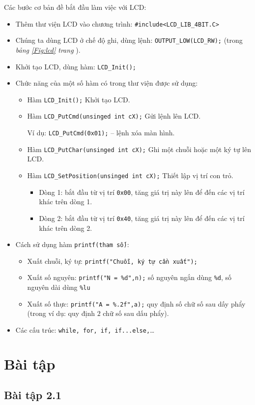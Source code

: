 Các bước cơ bản đề bắt đầu làm việc với LCD:
\begin{itemize}
\item Thêm thư viện LCD vào chương trình: \verb|#include<LCD_LIB_4BIT.C>|
\item Chúng ta dùng LCD ở chế độ ghi, dùng lệnh: \verb|OUTPUT_LOW(LCD_RW);| (trong \emph{bảng \ref{Fig:lcd} trang \pageref{Fig:lcd}}).
\item Khởi tạo LCD, dùng hàm: \verb|LCD_Init();|
\item Chức năng của một số hàm có trong thư viện được sử dụng:
\begin{itemize}
\item Hàm \verb|LCD_Init();| Khởi tạo LCD.
\item Hàm \verb|LCD_PutCmd(unsinged int cX);| Gửi lệnh lên LCD.

Ví dụ: \verb|LCD_PutCmd(0x01);| -- lệnh xóa màn hình.
\item Hàm \verb|LCD_PutChar(unsinged int cX);| Ghi một chuỗi hoặc một ký tự lên LCD.
\item Hàm \verb|LCD_SetPosition(unsinged int cX);| Thiết lập vị trí con trỏ.
\begin{itemize}
\item Dòng 1: bắt đầu từ vị trí \verb|0x00|, tăng giá trị này lên để đến các vị trí khác trên dòng 1.
\item Dòng 2: bắt đầu từ vị trí \verb|0x40|, tăng giá trị này lên để đến các vị trí khác trên dòng 2.
\end{itemize}
\end{itemize}
\item Cách sử dụng hàm \verb|printf(tham số)|: 
\begin{itemize}
\item Xuất chuỗi, ký tự: \verb|printf("Chuỗi, ký tự cần xuất");|
\item Xuất số nguyên: \verb|printf("N = %d",n);| số nguyên ngắn dùng \verb|%d|, số nguyên dài dùng \verb|%lu|
\item Xuất số thực: \verb|printf("A = %.2f",a);| quy định số chữ số sau dấy phẩy (trong ví dụ: quy định $2$ chữ số sau dấu phẩy).
\end{itemize}
\item Các cấu trúc: \verb|while, for, if, if...else,|\ldots
\end{itemize}
\section{Bài tập}
\subsection{Bài tập 2.1}
